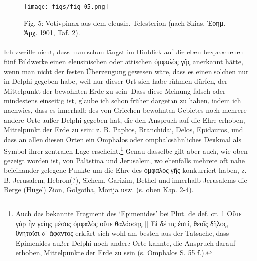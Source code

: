 \documentclass[a4paper, 11pt, oneside]{article}
\begin{document}
\begin{figure}[H]
\centering
\texttt{[image: figs/fig-05.png]}
\caption{Fig. 5: Votivpinax aus dem eleusin. Telesterion (nach Skias, Ἐφημ. Ἀρχ. 1901, Taf. 2).}
\end{figure}
\paragraph{}
Ich zweifle nicht, dass man schon längst im Hinblick auf die eben besprochenen fünf Bildwerke einen eleusinischen oder attischen ὀμφαλὸς γῆς anerkannt hätte, wenn man nicht der festen Überzeugung gewesen wäre, dass es einen solchen nur in Delphi gegeben habe, weil nur dieser Ort sich habe rühmen dürfen, der Mittelpunkt der bewohnten Erde zu sein. Dass diese Meinung falsch oder mindestens einseitig ist, glaube ich schon früher dargetan zu haben, indem ich nachwies, dass es innerhalb des von Griechen bewohnten Gebietes noch mehrere andere Orte außer Delphi gegeben hat, die den Anspruch auf die Ehre erhoben, Mittelpunkt der Erde zu sein: z. B. Paphos, Branchidai, Delos, Epidauros, und dass an allen diesen Orten ein Omphalos oder omphalosähnliches Denkmal als Symbol ihrer zentralen Lage erscheint.\footnote{Auch das bekannte Fragment des `Epimenides' bei Plut. de def. or. 1 Οὔτε γὰρ ἦν γαίης μέσος ὀμφαλὸς οὔτε θαλάσσης || Εἰ δέ τις ἐστί, θεοῖς δῆλος, θνητοῖσι δ᾽ ἄφαντος erklärt sich wohl am besten aus der Tatsache, dass Epimenides außer Delphi noch andere Orte kannte, die Anspruch darauf erhoben, Mittelpunkte der Erde zu sein (s. Omphalos S. 55 f.).} Genau dasselbe gilt aber auch, wie oben gezeigt worden ist, von Palästina und Jerusalem, wo ebenfalls mehrere oft nahe beieinander gelegene Punkte um die Ehre des ὀμφαλὸς γῆς konkurriert haben, z. B. Jerusalem, Hebron(?), Sichem, Garizim, Bethel und innerhalb Jerusalems die Berge (Hügel) Zion, Golgotha, Morija usw. (s. oben Kap. 2-4).
\end{document}
